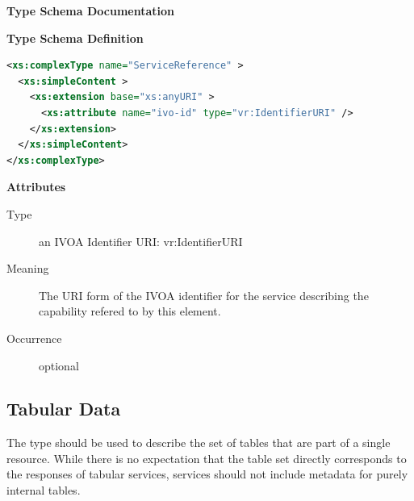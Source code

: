 \documentclass[11pt,a4paper]{ivoa}
\begin{document}
\begin{generated}
\begingroup
        \renewcommand*\descriptionlabel[1]{%
        \hbox to 5.5em{\emph{#1}\hfil}}\vspace{2ex}\noindent\textbf{ Type Schema Documentation}


\vspace{1ex}\noindent\textbf{ Type Schema Definition}

\begin{lstlisting}[language=XML,basicstyle=\footnotesize]
<xs:complexType name="ServiceReference" >
  <xs:simpleContent >
    <xs:extension base="xs:anyURI" >
      <xs:attribute name="ivo-id" type="vr:IdentifierURI" />
    </xs:extension>
  </xs:simpleContent>
</xs:complexType>
\end{lstlisting}

\vspace{0.5ex}\noindent\textbf{ Attributes}

\begingroup\small\begin{bigdescription}
\item[ivo-id]
\begin{description}
\item[Type] an IVOA Identifier URI: vr:IdentifierURI
\item[Meaning] The URI form of the IVOA identifier for the service
                   describing the capability refered to by this element.
\item[Occurrence] optional
\end{description}


\end{bigdescription}\endgroup

\endgroup
\end{generated}



\subsection{Tabular Data}
\label{sect:table}


The  type should be used
to describe the set of tables that are part of a single resource.
While there is
no expectation that the table set directly corresponds to the responses
of tabular services,
services should not include metadata for purely internal
tables.
\end{document}
